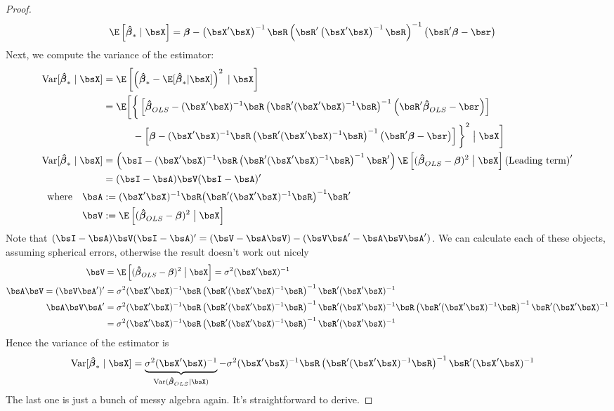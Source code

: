\documentclass[12pt]{article}
\theoremstyle{plain}
\theoremstyle{definition}
\theoremstyle{remark}
\newcommand{\bsbeta}{\boldsymbol{\beta}}
\newcommand{\bshatbeta}{\boldsymbol{\hat{\beta}}}
\newcommand{\Var}{\operatorname{Var}}
\begin{document}
\begin{proof}
\begin{align*}
  \E\left[ \bshatbeta_* \;|\; \bsX \right]
  &=
  \bsbeta
  -
  \left(\bsX'\bsX\right)^{-1}  \bsR
  \left(\bsR'\left(\bsX'\bsX\right)^{-1}  \bsR\right)^{-1}
  \left( \bsR' \bsbeta -  \bsr\right)
\end{align*}
Next, we compute the variance of the estimator:
\begin{align*}
  \Var[\bshatbeta_*\;|\;\bsX]
  &=
  \E\left[
    \left(\bshatbeta_*- \E[\bshatbeta_*|\bsX]\right)^2
  \;|\;\bsX \right] \\
  &=
  \E\bigg[
  \bigg\{
  \left[
  \bshatbeta_{OLS} - (\bsX'\bsX)^{-1}  \bsR
  \left(\bsR'(\bsX'\bsX)^{-1}  \bsR\right)^{-1}
  \left(\bsR'\bshatbeta_{OLS} -  \bsr\right)
  \right]\\
  &\qquad\quad
  -
  \left[
  \bsbeta -
  (\bsX'\bsX)^{-1}  \bsR \left(\bsR'(\bsX'\bsX)^{-1}\bsR\right)^{-1} \left(\bsR' \bsbeta -\bsr\right)
  \right]
  \bigg\}^2
  \;\big|\;\bsX
  \bigg] \\
  \Var[\bshatbeta_*\;|\;\bsX]
  &=
  \left(
  \bsI - (\bsX'\bsX)^{-1}  \bsR \left(\bsR'(\bsX'\bsX)^{-1}  \bsR\right)^{-1} \bsR'
  \right)
  \E\left[ (\bshatbeta_{OLS}-\bsbeta)^2 \;\big|\;\bsX \right]
  \left(
  \text{Leading term}
  \right)' \\
  &= (\bsI - \bsA)\bsV(\bsI-\bsA)'
  \\
  \text{where}
  \quad
  \bsA &:=
    (\bsX'\bsX)^{-1}  \bsR \big(\bsR'(\bsX'\bsX)^{-1}  \bsR\big)^{-1} \bsR' \\
  \bsV
  &:= \E\left[ (\bshatbeta_{OLS}-\bsbeta)^2 \;\big|\;\bsX \right]
\end{align*}
Note that
$(\bsI-\bsA)\bsV(\bsI-\bsA)'=(\bsV-\bsA\bsV)-(\bsV\bsA'-\bsA\bsV\bsA')$.
We can calculate each of these objects, assuming spherical errors,
otherwise the result doesn't work out nicely
\begin{align*}
  \bsV
  &=
  \E\left[ (\bshatbeta_{OLS}-\bsbeta)^2 \;\big|\;\bsX \right]
  =
  \sigma^2(\bsX'\bsX)^{-1} \\
  \bsA\bsV = (\bsV\bsA')'
  &=
  \sigma^2(\bsX'\bsX)^{-1}  \bsR \left(\bsR'(\bsX'\bsX)^{-1}  \bsR\right)^{-1} \bsR'
  (\bsX'\bsX)^{-1} \\
  \bsA\bsV\bsA'
  &=
  \sigma^2(\bsX'\bsX)^{-1}  \bsR \left(\bsR'(\bsX'\bsX)^{-1}  \bsR\right)^{-1} \bsR'
  (\bsX'\bsX)^{-1}
  \bsR \left(\bsR'(\bsX'\bsX)^{-1}  \bsR\right)^{-1} \bsR'(\bsX'\bsX)^{-1}
  \\
  &=
  \sigma^2(\bsX'\bsX)^{-1}  \bsR
  \left(\bsR'(\bsX'\bsX)^{-1}  \bsR\right)^{-1} \bsR'(\bsX'\bsX)^{-1}
\end{align*}
Hence the variance of the estimator is
\begin{align*}
  \Var[\bshatbeta_*\;|\;\bsX]
  &=
  \underbrace{\sigma^2(\bsX'\bsX)^{-1}}_{\Var(\bshatbeta_{OLS}|\bsX)}
  -
  \sigma^2(\bsX'\bsX)^{-1}  \bsR
  \left(\bsR'(\bsX'\bsX)^{-1}  \bsR\right)^{-1} \bsR'(\bsX'\bsX)^{-1}
\end{align*}
The last one is just a bunch of messy algebra again. It's
straightforward to derive.
\end{proof}
\end{document}
